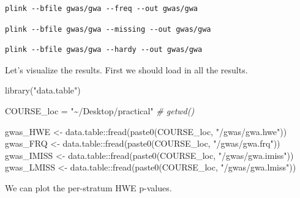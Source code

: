 \documentclass[
]{book}
\newenvironment{Shaded}{\begin{snugshade}}{\end{snugshade}}
\newcommand{\CommentTok}[1]{\textcolor[rgb]{0.56,0.35,0.01}{\textit{#1}}}
\newcommand{\FunctionTok}[1]{\textcolor[rgb]{0.00,0.00,0.00}{#1}}
\newcommand{\NormalTok}[1]{#1}
\newcommand{\OtherTok}[1]{\textcolor[rgb]{0.56,0.35,0.01}{#1}}
\newcommand{\SpecialCharTok}[1]{\textcolor[rgb]{0.00,0.00,0.00}{#1}}
\newcommand{\StringTok}[1]{\textcolor[rgb]{0.31,0.60,0.02}{#1}}
\begin{document}
\begin{verbatim}
plink --bfile gwas/gwa --freq --out gwas/gwa
\end{verbatim}

\begin{verbatim}
plink --bfile gwas/gwa --missing --out gwas/gwa
\end{verbatim}

\begin{verbatim}
plink --bfile gwas/gwa --hardy --out gwas/gwa
\end{verbatim}

Let's visualize the results. First we should load in all the results.

\begin{Shaded}
\begin{Highlighting}[]
\FunctionTok{library}\NormalTok{(}\StringTok{"data.table"}\NormalTok{)}

\NormalTok{COURSE\_loc }\OtherTok{=} \StringTok{"\textasciitilde{}/Desktop/practical"} \CommentTok{\# getwd()}

\NormalTok{gwas\_HWE }\OtherTok{\textless{}{-}}\NormalTok{ data.table}\SpecialCharTok{::}\FunctionTok{fread}\NormalTok{(}\FunctionTok{paste0}\NormalTok{(COURSE\_loc, }\StringTok{"/gwas/gwa.hwe"}\NormalTok{))}
\NormalTok{gwas\_FRQ }\OtherTok{\textless{}{-}}\NormalTok{ data.table}\SpecialCharTok{::}\FunctionTok{fread}\NormalTok{(}\FunctionTok{paste0}\NormalTok{(COURSE\_loc, }\StringTok{"/gwas/gwa.frq"}\NormalTok{))}
\NormalTok{gwas\_IMISS }\OtherTok{\textless{}{-}}\NormalTok{ data.table}\SpecialCharTok{::}\FunctionTok{fread}\NormalTok{(}\FunctionTok{paste0}\NormalTok{(COURSE\_loc, }\StringTok{"/gwas/gwa.imiss"}\NormalTok{))}
\NormalTok{gwas\_LMISS }\OtherTok{\textless{}{-}}\NormalTok{ data.table}\SpecialCharTok{::}\FunctionTok{fread}\NormalTok{(}\FunctionTok{paste0}\NormalTok{(COURSE\_loc, }\StringTok{"/gwas/gwa.lmiss"}\NormalTok{))}
\end{Highlighting}
\end{Shaded}

We can plot the per-stratum HWE p-values.
\end{document}
